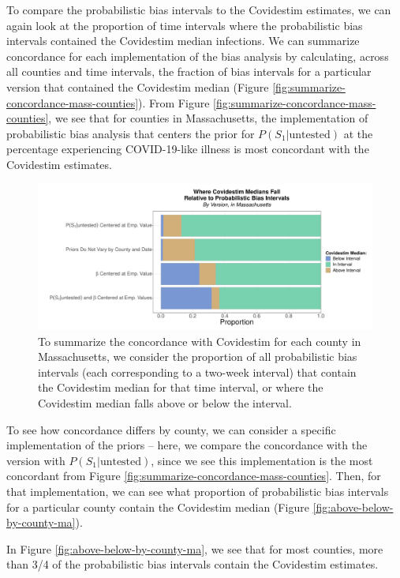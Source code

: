 \documentclass[12pt,twoside]{smiththesis}
\begin{document}
To compare the probabilistic bias intervals to the Covidestim estimates, we can again look at the proportion of time intervals where the probabilistic bias intervals contained the Covidestim median infections. We can summarize concordance for each implementation of the bias analysis by calculating, across all counties and time intervals, the fraction of bias intervals for a particular version that contained the Covidestim median (Figure \ref{fig:summarize-concordance-mass-counties}). From Figure \ref{fig:summarize-concordance-mass-counties}, we see that for counties in Massachusetts, the implementation of probabilistic bias analysis that centers the prior for \(P(S_1|\text{untested})\) at the percentage experiencing COVID-19-like illness is most concordant with the Covidestim estimates.
\begin{figure}
\includegraphics[width=1\linewidth]{figure/summarize-concordance-mass-counties} \caption{\label{fig:summarize-concordance-mass-counties} To summarize the concordance with Covidestim for each county in Massachusetts, we consider the proportion of all probabilistic bias intervals (each corresponding to a two-week interval) that contain the Covidestim median for that time interval, or where the Covidestim median falls above or below the interval.}\label{fig:unnamed-chunk-91}
\end{figure}
To see how concordance differs by county, we can consider a specific implementation of the priors -- here, we compare the concordance with the version with \(P(S_1|\text{untested})\), since we see this implementation is the most concordant from Figure \ref{fig:summarize-concordance-mass-counties}. Then, for that implementation, we can see what proportion of probabilistic bias intervals for a particular county contain the Covidestim median (Figure \ref{fig:above-below-by-county-ma}).

In Figure \ref{fig:above-below-by-county-ma}, we see that for most counties, more than 3/4 of the probabilistic bias intervals contain the Covidestim estimates.
\end{document}
